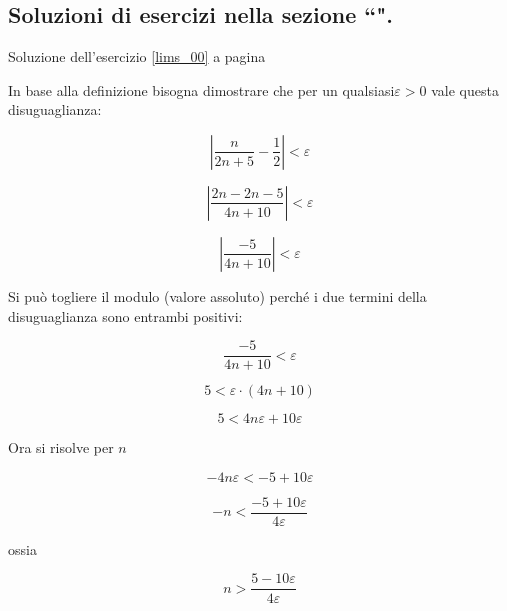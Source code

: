 

\subsection{Soluzioni di esercizi nella sezione ``\textbf{}".}

Soluzione dell'esercizio \ref{lims_00} a pagina \pageref{lims_00}\label{limss_00}

In base alla definizione bisogna dimostrare che per un qualsiasi$\varepsilon > 0$
vale questa disuguaglianza: 

\begin{equation*}
\left|
\frac{
n
}{
2n+5
}-\frac{1}{2}
\right|
<\varepsilon
\end{equation*}


\begin{equation*}
\left|
\frac{
2n -2n -5
}{
4n+10
}
\right|
<\varepsilon
\end{equation*}


\begin{equation*}
\left|
\frac{
-5
}{
4n+10
}
\right|
<\varepsilon
\end{equation*}

Si può togliere il modulo (valore assoluto) perché i due termini della disuguaglianza sono entrambi positivi:


\begin{equation*}
\frac{
-5
}{
4n+10
}
<\varepsilon
\end{equation*}


\begin{equation*}
5
<\varepsilon
\cdot(4n+10)
\end{equation*}



\begin{equation*}
5
<4n\varepsilon+10\varepsilon
\end{equation*}

Ora si risolve per $n$

\begin{equation*}
-4n\varepsilon
<
-5
+10\varepsilon
\end{equation*}


\begin{equation*}
-n
<
\frac{
-5
+10\varepsilon
}{4\varepsilon}
\end{equation*}

ossia 

\begin{equation*}
n
>
\frac{
5
-10\varepsilon
}{4\varepsilon}
\end{equation*}

